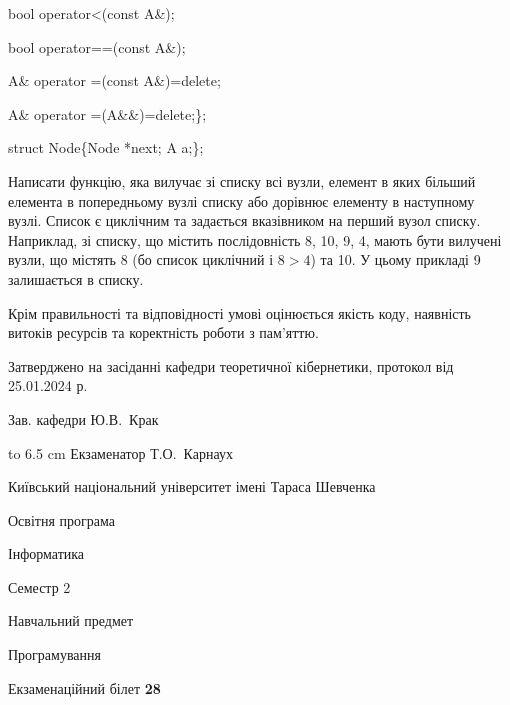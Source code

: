 \documentclass[12pt, ukrainian]{article}
\begin{document}
{\quad  bool operator<(const A\&); 

\quad  bool operator==(const A\&); 

\quad A\& operator =(const A\&)=delete; 

\quad  A\& operator =(A\&\&)=delete;\};

struct Node\{Node *next; A a;\};

 Написати функцію, яка вилучає зі списку всі вузли, елемент в яких більший елемента в попередньому вузлі списку або дорівнює елементу в наступному вузлі. Список є циклічним та задається вказівником на перший вузол списку. Наприклад, зі списку, що містить послідовність 8, 10, 9, 4, мають бути вилучені вузли, що містять 8 (бо список циклічний і $8>4$) та 10. У цьому прикладі 9 залишається в списку.

Крім правильності та відповідності умові оцінюється якість коду, наявність витоків ресурсів та коректність роботи з пам'яттю. 

}
{\smallskip\smallskip \begin {scriptsize} Затверджено на засіданні кафедри теоретичної кібернетики, протокол   від   25.01.2024 р.\par\smallskip\smallskip\smallskip\smallskip
{\parbox {6.5 cm} {Зав. кафедри \dotfill Ю.В.~Крак}}\hspace {0.7cm} {\hbox to 6.5 cm { Екзаменатор \dotfill Т.О.~Карнаух}} \end{scriptsize}}
\newpage
{{\begin {scriptsize}\par
{ \center  Київський національний університет імені Тараса Шевченка \par}
{\parbox {5 cm}{Освітня програма \hfill}{\parbox {7 cm}{Інформатика\hfill}}\parbox {6 cm}{\hfill Семестр 2}}\par
{\parbox {5 cm} {Навчальний предмет \hfill}\parbox {7 cm}{Програмування \hfill}\parbox {6cm}{\hfill}\par}\vspace{-15pt} \end{scriptsize}}{\center Екзаменаційний білет \No \textbf { 28 }\par}}
\end{document}
